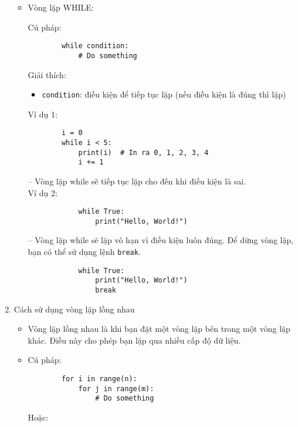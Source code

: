 \begin{enumerate}[label=\alph*.]
    \begin{itemize}
        \item Vòng lặp WHILE:

        Cú pháp:
        \begin{lstlisting}
        while condition:
            # Do something
        \end{lstlisting}
        \vspace{-3.5em}
        Giải thích:
        \begin{itemize}
            \item \texttt{condition}: điều kiện để tiếp tục lặp (nếu điều kiện là đúng thì lặp)
        \end{itemize}

        Ví dụ 1:
        \begin{lstlisting}
        i = 0
        while i < 5:
            print(i)  # In ra 0, 1, 2, 3, 4
            i += 1
        \end{lstlisting}
        \vspace{-4.5em}
        -- Vòng lặp while sẽ tiếp tục lặp cho đến khi điều kiện là sai.\\
        Ví dụ 2:
        \begin{lstlisting}
            while True:
                print("Hello, World!")
        \end{lstlisting}
        \vspace{-4.5em}
        -- Vòng lặp while sẽ lặp vô hạn vì điều kiện luôn đúng. Để dừng vòng lặp, bạn có thể sử dụng lệnh \texttt{break}.
        \begin{lstlisting}
            while True:
                print("Hello, World!")
                break
        \end{lstlisting}
    \end{itemize}
    \vspace{-6em}
    \item Cách sử dụng vòng lặp lồng nhau
    \begin{itemize}
        \item Vòng lặp lồng nhau là khi bạn đặt một vòng lặp bên trong một vòng lặp khác. Điều này cho phép bạn lặp qua nhiều cấp độ dữ liệu.
        \item Cú pháp:
        \begin{lstlisting}
        for i in range(n):
            for j in range(m):
                # Do something
        \end{lstlisting}
        \vspace{-4.5em}
        Hoặc:

\end{itemize}
\end{enumerate}
